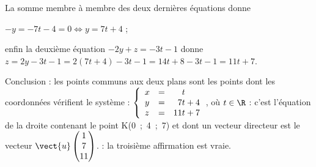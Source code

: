 \begin{enumerate}
\begin{enumerate}
La somme membre à membre des deux dernières équations donne

$-y =- 7t - 4 = 0 \iff y = 7t + 4 $ ;

enfin la deuxième équation $-2y + z = - 3t - 1$ donne $z = 2y - 3t - 1 = 2(7t + 4) - 3t - 1 = 14t + 8 - 3t - 1 = 11t + 7$.
		\end{enumerate}


Conclusion : les points communs aux deux plans sont les points dont les coordonnées vérifient le système : $\left\{\begin{array}{l c l}
x&=& \phantom{17}t\\
y& =& \phantom{1}7t + 4 \\
z& =& 11t + 7
\end{array}\right.$, où $t \in \R$ : c'est l'équation de la droite contenant le point K(0~;~4~;~7) et dont un vecteur directeur est le vecteur $\vect{u}\begin{pmatrix} 1\\7\\11\end{pmatrix}$. : la troisième affirmation est vraie.
\end{enumerate}

\vspace{0,5cm}
